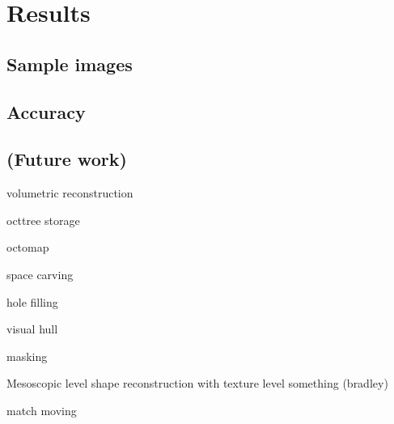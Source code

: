 \section{Results}

\subsection{Sample images}

\subsection{Accuracy}

\subsection{(Future work)}

volumetric reconstruction

octtree storage

octomap

space carving

hole filling

visual hull

masking

Mesoscopic level shape reconstruction with texture level something (bradley)

match moving

